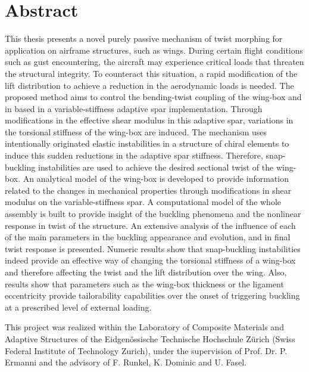 \section*{Abstract}

This thesis presents a novel purely passive mechanism of twist morphing for application on airframe structures, such as wings. During certain flight conditions such as gust encountering, the aircraft may experience critical loads that threaten the structural integrity. To counteract this situation, a rapid modification of the lift distribution to achieve a reduction in the aerodynamic loads is needed. The proposed method aims to control the bending-twist coupling of the wing-box and in based in a variable-stiffness adaptive spar implementation. Through modifications in the effective shear modulus in this adaptive spar, variations in the torsional stiffness of the wing-box are induced. The mechanism uses intentionally originated elastic instabilities in a structure of chiral elements to induce this sudden reductions in the adaptive spar stiffness. Therefore, snap-buckling instabilities are used to achieve the desired sectional twist of the wing-box. An analytical model of the wing-box is developed to provide information related to the changes in mechanical properties through modifications in shear modulus on the variable-stiffness spar. A computational model of the whole assembly is built to provide insight of the buckling phenomena and the nonlinear response in twist of the structure. An extensive analysis of the influence of each of the main parameters in the buckling appearance and evolution, and in final twist response is presented. Numeric results show that snap-buckling instabilities indeed provide an effective way of changing the torsional stiffness of a wing-box and therefore affecting the twist and the lift distribution over the wing. Also, results show that parameters such as the wing-box thickness or the ligament eccentricity provide tailorability capabilities over the onset of triggering buckling at a prescribed level of external loading. 



\vfill
\normalsize
\noindent
This project was realized within the Laboratory of Composite Materials and Adaptive Structures of the Eidgen\"ossische Technische Hochschule Z\"urich (Swiss Federal Institute of Technology Zurich), under the supervision of Prof. Dr. P. Ermanni and the advisory of F. Runkel, K. Dominic and U. Fasel.